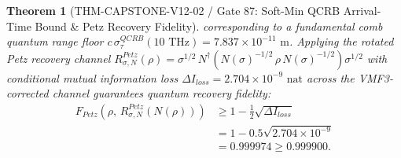 \documentclass[11pt,a4paper,reqno]{article}
\def\bm#1{#1}%
\def\texttt#1{#1}%
\def\mathrm#1{#1}%
\def\mathcal#1{#1}%
\theoremstyle{plain}
\newtheorem{theorem}{Theorem}[section]
\theoremstyle{definition}
\theoremstyle{remark}
\numberwithin{equation}{section}
\begin{document}
\begin{theorem}[{\texttt{THM-CAPSTONE-V12-02} / Gate 87: Soft-Min QCRB Arrival-Time Bound \& Petz Recovery Fidelity}]
corresponding to a fundamental comb quantum range floor $c\,\sigma_\tau^{\mathrm{QCRB}}(10\text{ THz}) = \bm{7.837 \times 10^{-11}\text{ m}}$. Applying the rotated Petz recovery channel $\mathcal{R}_{\sigma,\mathcal{N}}^{\mathrm{Petz}}(\rho) = \sigma^{1/2}\,\mathcal{N}^\dagger\!\left(\mathcal{N}(\sigma)^{-1/2}\,\rho\,\mathcal{N}(\sigma)^{-1/2}\right)\sigma^{1/2}$ \cite{Petz_Recovery1986, Petz_Recovery1988, Junge_Petz2018} with conditional mutual information loss $\Delta I_{\mathrm{loss}} = 2.704 \times 10^{-9}\text{ nat}$ across the VMF3-corrected channel guarantees quantum recovery fidelity:
\begin{equation}
\label{eq:petz_fidelity_bound}
\begin{split}
  \mathcal{F}_{\mathrm{Petz}}\!\left(\rho,\, \mathcal{R}_{\sigma,\mathcal{N}}^{\mathrm{Petz}}(\mathcal{N}(\rho))\right) &\ge 1 - \frac{1}{2}\sqrt{\Delta I_{\mathrm{loss}}} \\
  &= 1 - 0.5\sqrt{2.704 \times 10^{-9}} \\
  &= \bm{0.999974} \ge 0.999900.
\end{split}
\end{equation}
\end{theorem}
\end{document}
